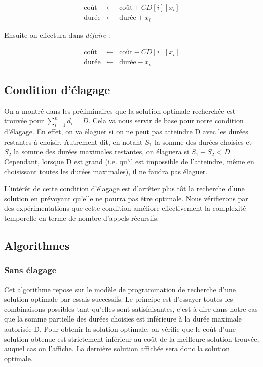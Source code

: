 \documentclass[a4paper, titlepage]{article}
\begin{document}
			\begin{eqnarray*}
				\mbox{coût}  & \leftarrow & \mbox{coût} + CD[i][x_{i}] \\
				\mbox{durée} & \leftarrow & \mbox{durée} + x_{i}
			\end{eqnarray*}

		Ensuite on effectura dans \emph{défaire} :

			\begin{eqnarray*}
				\mbox{coût}  & \leftarrow & \mbox{coût} - CD[i][x_{i}] \\
				\mbox{durée} & \leftarrow & \mbox{durée} - x_{i}
			\end{eqnarray*}


	\subsection{Condition d'élagage}
	On a montré dans les préliminaires que la solution optimale recherchée est trouvée pour $\sum_{i=1}^{n} d_i = D$.
	Cela va nous servir de base pour notre condition d'élagage.
	En effet, on va élaguer si on ne peut pas atteindre D avec les durées restantes à choisir.
	Autrement dit, en notant $S_1$ la somme des durées choisies et $S_2$ la somme des durées maximales restantes, on élaguera si $S_1 + S_2 < D$.
	Cependant, lorsque D est grand (i.e. qu'il est impossible de l'atteindre, même en choisissant toutes les durées maximales), il ne faudra pas élaguer.

	L'intérêt de cette condition d'élagage est d'arrêter plus tôt la recherche d'une solution en prévoyant qu'elle ne pourra pas être optimale.
	Nous vérifierons par des expérimentations que cette condition améliore effectivement la complexité temporelle en terme de nombre d'appels récursifs.

	\subsection{Algorithmes}

		\subsubsection{Sans élagage}

			Cet algorithme repose sur le modèle de programmation de recherche d'une solution optimale par essais successifs.
			Le principe est d'essayer toutes les combinaisons possibles tant qu'elles sont satisfaisantes, c'est-à-dire dans notre cas que la somme partielle des durées choisies est inférieure à la durée maximale autorisée D.
			Pour obtenir la solution optimale, on vérifie que le coût d'une solution obtenue est strictement inférieur au coût de la meilleure solution trouvée, auquel cas on l'affiche.
			La dernière solution affichée sera donc la solution optimale.
\end{document}
